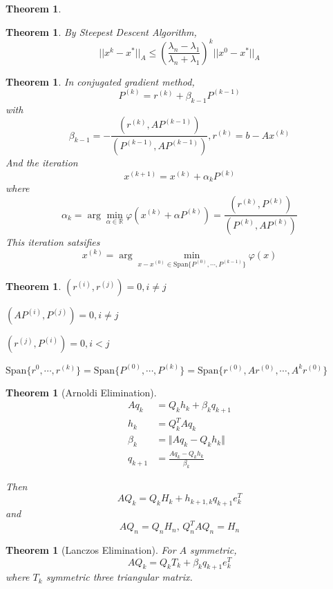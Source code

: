 \documentclass[12pt,b5paper,notitlepage]{article}
\theoremstyle{definition}
\theoremstyle{remark}
\theoremstyle{plain}
\newtheorem{theorem}[definition]{Theorem}
\newcommand{\Span}{\mathrm{Span}}
\numberwithin{equation}{section}
\renewcommand{\|}{\Vert}
\begin{document}
\begin{theorem}
    
\end{theorem}
\begin{theorem}
    By Steepest Descent Algorithm, 
    \[||x^k-x^*||_A \leq \left(\frac{\lambda_n-\lambda_1}{\lambda_n+\lambda_1}\right)^k||x^0-x^*||_A\]
\end{theorem}
\begin{theorem}
    In conjugated gradient method,
    \[P^{(k)}=r^{(k)}+\beta_{k-1}P^{(k-1)}\]
    with 
    \[\beta_{k-1}=-\frac{(r^{(k)},AP^{(k-1)})}{(P^{(k-1)},AP^{(k-1)})},r^{(k)}=b-Ax^{(k)}\]
    And the iteration
    \[x^{(k+1)}=x^{(k)}+\alpha_kP^{(k)}\]
    where 
    \[\alpha_k=\arg\min_{\alpha\in\mathbb R}\varphi(x^{(k)}+\alpha P^{(k)})=\frac{(r^{(k)},P^{(k)})}{(P^{(k)},AP^{(k)})}\]
    This iteration satsifies
    \[x^{(k)}=\arg\min_{x-x^{(0)}\in\Span\{P^{(0)},\cdots,P^{(k-1)}\}}\varphi(x)\]
\end{theorem}
\begin{theorem}
     $ (r^{(i)},r^{(j)})=0,i\not=j $
     
      $ (AP^{(i)},P^{(j)})=0 ,i\not=j$ 

       $ (r^{(j)},P^{(i)})=0,i<j $ 

        $ \Span\{r^{0},\cdots,r^{(k)}\}=\Span\{P^{(0)},\cdots,P^{(k)}\}=\Span\{r^{(0)},Ar^{(0)},\cdots,A^kr^{(0)}\} $ 
\end{theorem}
\begin{theorem}[Arnoldi Elimination]
    \begin{align*}
        Aq_k&=Q_kh_k+\beta_kq_{k+1}\\
        h_k&=Q_k^TAq_k\\
        \beta_k&=\|Aq_k-Q_kh_k\|\\
        q_{k+1}&=\frac{Aq_k-Q_kh_k}{\beta_k}
    \end{align*}

    Then 
    \[AQ_k=Q_kH_k+h_{k+1,k}q_{k+1}e_k^T\]
    and 
    \[AQ_n=Q_nH_n,\,Q_n^TAQ_n=H_n\]
\end{theorem}
\begin{theorem}[Lanczos Elimination]
    For  $ A  $ symmetric, 
    \[AQ_k=Q_kT_k+\beta_kq_{k+1}e_k^T\]
    where  $ T_k $ symmetric three triangular matrix. 
\end{theorem}
\end{document}
